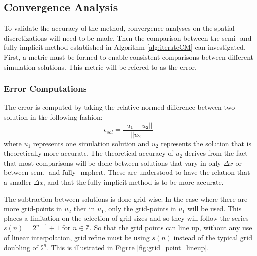 \subsection{Convergence Analysis}
  To validate the accuracy of the method, convergence analyses on the spatial discretizations will need to be made. 
  Then the comparison between the semi- and fully-implicit method established in Algorithm \ref{alg:iterateCM} can investigated.
  First, a metric must be formed to enable consistent comparisons between different simulation solutions. 
  This metric will be refered to as the error.

\subsubsection{Error Computations}

  The error is computed by taking the relative normed-difference between two solution in the following fashion:
  \begin{equation} \label{equ:error_comp}
    \epsilon_{sol} = \frac{||u_1 - u_2||}{||u_2||}
  \end{equation}
  where $u_1$ represents one simulation solution and $u_2$ represents the solution that is theoretically more accurate.
  The theoretical accuracy of $u_2$ derives from the fact that most comparisons will be done between solutions that vary in only $\Delta x$ or between semi- and fully- implicit.
  These are understood to have the relation that a smaller $\Delta x$, and that the fully-implicit method is to be more accurate.


  The subtraction between solutions is done grid-wise.
  In the case where there are more grid-points in $u_2$ then in $u_1$, only the grid-points in $u_1$ will be used.
  This places a limitation on the selection of grid-sizes and so they will follow the series $s(n) = 2^{n-1}+1$ for $n \in \mathbb{Z}$.
  So that the grid points can line up, without any use of linear interpolation, grid refine must be using $s(n)$ instead of the typical grid doubling of $2^{n}$. 
  This is illustrated in Figure \ref{fig:grid_point_lineup}.


